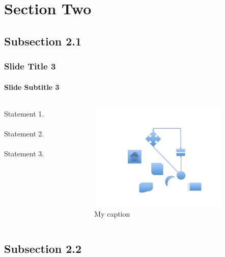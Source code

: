 \documentclass[xcolor={usenames,dvipsnames},hyperref={hyperindex,bookmarks}]{beamer}
\begin{document}
\section{Section Two}


\subsection{Subsection 2.1}


\begin{frame}
	\frametitle{Slide Title 3}
	\framesubtitle{Slide Subtitle 3}
	
	\begin{columns}[t]			%
		\begin{column}[T]{5cm}	%
		
		Statement 1. \\
		\ \\
		Statement 2. \\
		\ \\
		Statement 3.
		\end{column}
		
		\begin{column}[T]{5cm}	%
			\begin{figure}
			\centering
			\includegraphics[height=2in]{./pics/my_figure}
			\caption{My caption \cite{Petroski1992,Kopka2004}}
			\end{figure}
		\end{column}
	\end{columns}
\end{frame}

\subsection{Subsection 2.2}
\end{document}
